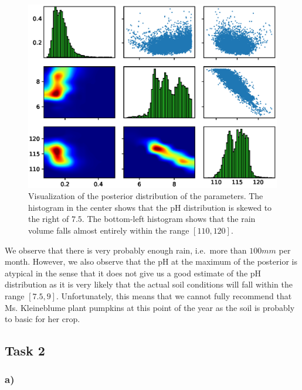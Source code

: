 \documentclass{article}
\begin{document}
    \begin{figure}[H]
        \begin{center}
            \includegraphics[width=.75\textwidth]{task1/results/task1d.eps}
        \end{center}
        \caption{Visualization of the posterior distribution of the
        parameters.
        The histogram in the center shows that the pH distribution is skewed
        to the right of $7.5$.
        The bottom-left histogram shows that the rain volume falls almost
        entirely within the range $\left[ 110, 120 \right]$.
        }
        \label{fig:GrassPosterior}
    \end{figure}

    We observe that there is very probably enough rain, i.e.\ more than
    $100mm$ per month.
    However, we also observe that the pH at the maximum of the posterior is
    atypical in the sense that it does not give us a good estimate of the pH
    distribution as it is very likely that the actual soil conditions will
    fall within the range $\left[ 7.5, 9 \right]$.
    Unfortunately, this means that we cannot fully recommend that Ms.
    Kleineblume plant pumpkins at this point of the year as the soil is
    probably to basic for her crop.

    \subsection*{Task 2}
    \label{subsec:Task2}

    \subsubsection*{a)}
    \label{subsubsec:Task2a}
\end{document}

